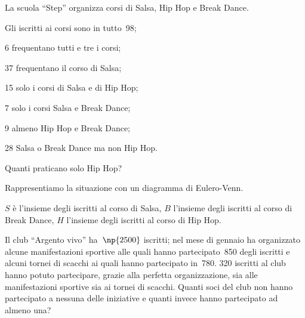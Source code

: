 \begin{esercizio}
\label{ese:7.25}
La scuola ``Step'' organizza corsi di Salsa, Hip Hop e Break Dance.

\begin{enumeratea}
\item Gli iscritti ai corsi sono in tutto~98;
\item 6 frequentano tutti e tre i corsi;
\item 37 frequentano il corso di Salsa;
\item 15 solo i corsi di Salsa e di Hip Hop;
\item 7 solo i corsi Salsa e Break Dance;
\item 9 almeno Hip Hop e Break Dance;
\item 28 Salsa o Break Dance ma non Hip Hop.
\end{enumeratea}

Quanti praticano solo Hip Hop?

Rappresentiamo la situazione con un diagramma di Eulero-Venn.
\begin{center}
 
\end{center}
$S$ è l'insieme degli iscritti al corso di Salsa, $B$ l'insieme degli iscritti al corso di
Break Dance, $H$ l'insieme degli iscritti al corso di Hip Hop.
\end{esercizio}

\begin{esercizio}
\label{ese:7.26}
Il club ``Argento vivo'' ha~$\np{2500}$ iscritti; nel mese di gennaio ha organizzato alcune
manifestazioni sportive alle quali hanno partecipato~850 degli iscritti
e alcuni tornei di scacchi ai quali hanno partecipato in~780. 320
iscritti al club hanno potuto partecipare, grazie alla perfetta
organizzazione, sia alle manifestazioni sportive sia ai tornei di
scacchi. Quanti soci del club non hanno partecipato a nessuna delle
iniziative e quanti invece hanno partecipato ad almeno una?
\end{esercizio}

